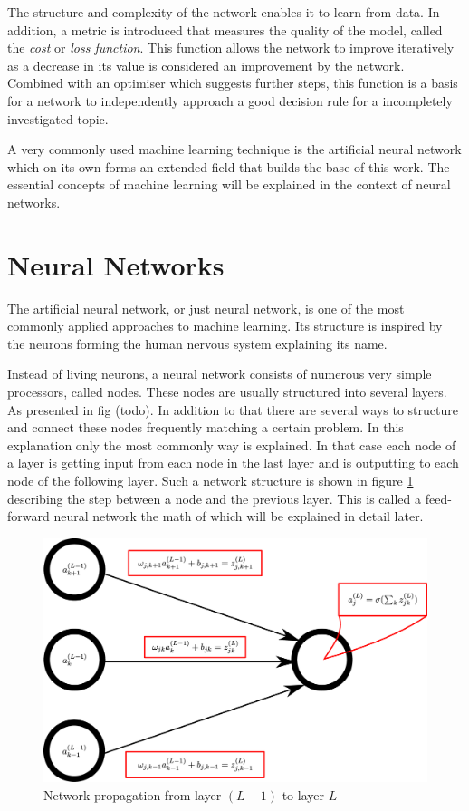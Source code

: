 The structure and complexity of the network enables it to learn from data. In addition, a metric is introduced that measures the quality of the model, called the \emph{cost} or \emph{loss function}. This function allows the network to improve iteratively as a decrease in its value is considered an improvement by the network. Combined with an optimiser which suggests further steps, this function is a basis for a network to independently approach a good decision rule for a incompletely investigated topic.

A very commonly used machine learning technique is the artificial neural network which on its own forms an extended field that builds the base of this work. The essential concepts of machine learning will be explained in the context of neural networks.

\section{Neural Networks}

The artificial neural network, or just neural network, is one of the most commonly applied approaches to machine learning. Its structure is inspired by the neurons forming the human nervous system explaining its name.

Instead of living neurons, a neural network consists of numerous very simple processors, called nodes.
 These nodes are usually structured into several layers. As presented in fig (todo). In addition to that there are several ways to structure and connect these nodes frequently matching a certain problem. In this explanation only the most commonly way is explained. In that case each node of a layer is getting input from each node in the last layer and is outputting to each node of the following layer. Such a network structure is shown in figure \ref{fig:nodes_nomenclature} describing the step between a node and the previous layer. This is called a feed-forward neural network the math of which will be explained in detail later.

\begin{figure}[htbp]
	\centering
	\includegraphics[scale=0.18]{figures_ML/nodes_nomenclature.eps}
	\caption[Network parameter nomenclature]{Network propagation from layer $(L-1)$ to layer $L$}
	\label{fig:nodes_nomenclature}
\end{figure}


